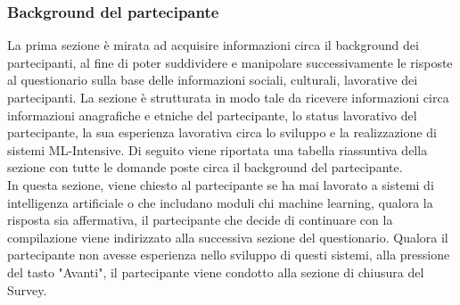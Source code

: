    \subsubsection{Background del partecipante}
   La prima sezione è mirata ad acquisire informazioni circa il background dei partecipanti, al fine di poter suddividere e manipolare successivamente le risposte al questionario sulla base delle informazioni sociali, culturali, lavorative dei partecipanti. La sezione è strutturata in modo tale da ricevere informazioni circa informazioni anagrafiche e etniche del partecipante, lo status lavorativo del partecipante, la sua esperienza lavorativa circa lo sviluppo e la realizzazione di sistemi ML-Intensive. Di seguito viene riportata una tabella riassuntiva della sezione con tutte le domande poste circa il background del partecipante.\\
   
   In questa sezione, viene chiesto al partecipante se ha mai lavorato a sistemi di intelligenza artificiale o che includano moduli chi machine learning, qualora la risposta sia affermativa, il partecipante che decide di continuare con la compilazione viene indirizzato alla successiva sezione del questionario. Qualora il partecipante non avesse esperienza nello sviluppo di questi sistemi, alla pressione del tasto "Avanti", il partecipante viene condotto alla sezione di chiusura del Survey.
   
